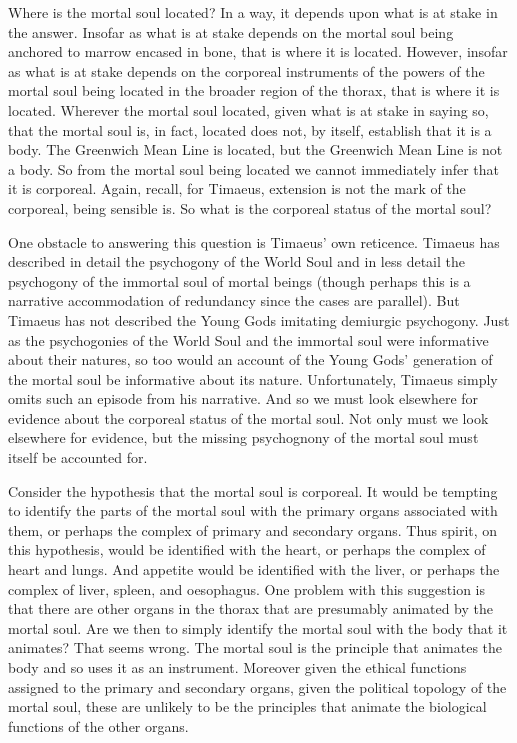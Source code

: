 Where is the mortal soul located? In a way, it depends upon what is at stake in the answer. Insofar as what is at stake depends on the mortal soul being anchored to marrow encased in bone, that is where it is located. However, insofar as what is at stake depends on the corporeal instruments of the powers of the mortal soul being located in the broader region of the thorax, that is where it is located. Wherever the mortal soul located, given what is at stake in saying so, that the mortal soul is, in fact, located does not, by itself, establish that it is a body. The Greenwich Mean Line is located, but the Greenwich Mean Line is not a body. So from the mortal soul being located we cannot immediately infer that it is corporeal. Again, recall, for Timaeus, extension is not the mark of the corporeal, being sensible is. So what is the corporeal status of the mortal soul?

One obstacle to answering this question is Timaeus' own reticence. Timaeus has described in detail the psychogony of the World Soul and in less detail the psychogony of the immortal soul of mortal beings (though perhaps this is a narrative accommodation of redundancy since the cases are parallel). But Timaeus has not described the Young Gods imitating demiurgic psychogony. Just as the psychogonies of the World Soul and the immortal soul were informative about their natures, so too would an account of the Young Gods' generation of the mortal soul be informative about its nature. Unfortunately, Timaeus simply omits such an episode from his narrative. And so we must look elsewhere for evidence about the corporeal status of the mortal soul. Not only must we look elsewhere for evidence, but the missing psychognony of the mortal soul must itself be accounted for.

Consider the hypothesis that the mortal soul is corporeal. It would be tempting to identify the parts of the mortal soul with the primary organs associated with them, or perhaps the complex of primary and secondary organs. Thus spirit, on this hypothesis, would be identified with the heart, or perhaps the complex of heart and lungs. And appetite would be identified with the liver, or perhaps the complex of liver, spleen, and oesophagus. One problem with this suggestion is that there are other organs in the thorax that are presumably animated by the mortal soul. Are we then to simply identify the mortal soul with the body that it animates? That seems wrong. The mortal soul is the principle that animates the body and so uses it as an instrument. Moreover given the ethical functions assigned to the primary and secondary organs, given the political topology of the mortal soul, these are unlikely to be the principles that animate the biological functions of the other organs.

